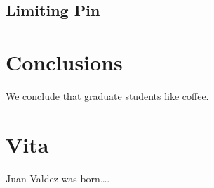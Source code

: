 \documentclass[edeposit,fullpage,11pt]{uiucthesis2009}
\begin{document}
\section{Limiting Pin}

\chapter{Conclusions}

We conclude that graduate students like coffee.

\backmatter



\chapter{Vita}

Juan Valdez was born\ldots.
\end{document}
